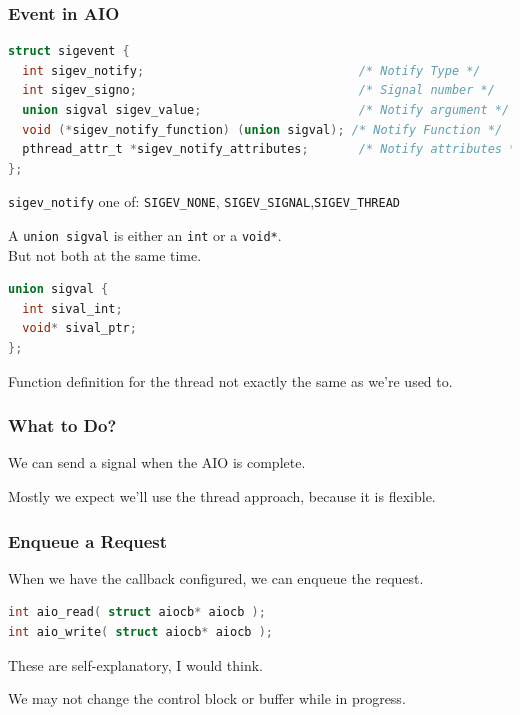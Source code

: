 \begin{frame}[fragile]
	\frametitle{Event in AIO}

	\begin{lstlisting}[language=C]
struct sigevent {
  int sigev_notify;                              /* Notify Type */
  int sigev_signo;                               /* Signal number */
  union sigval sigev_value;                      /* Notify argument */
  void (*sigev_notify_function) (union sigval); /* Notify Function */
  pthread_attr_t *sigev_notify_attributes;       /* Notify attributes */
};
\end{lstlisting}

	\texttt{sigev\_notify} one of: \texttt{SIGEV\_NONE}, \texttt{SIGEV\_SIGNAL},\texttt{SIGEV\_THREAD}

	A \texttt{union sigval} is either an \texttt{int} or a \texttt{void*}.\\
	\quad But not both at the same time.

	\begin{lstlisting}[language=C]
union sigval {
  int sival_int;
  void* sival_ptr;
};
\end{lstlisting}

	Function definition for the thread not exactly the same as we're used to.

\end{frame}


\begin{frame}
	\frametitle{What to Do?}

	We can send a signal when the AIO is complete.

	Mostly we expect we'll use the thread approach, because it is flexible.


\end{frame}


\begin{frame}[fragile]
	\frametitle{Enqueue a Request}

	When we have the callback configured, we can enqueue the request.

	\begin{lstlisting}[language=C]
int aio_read( struct aiocb* aiocb );
int aio_write( struct aiocb* aiocb );
\end{lstlisting}

	These are self-explanatory, I would think.

	We may not change the control block or buffer while in progress.

\end{frame}


